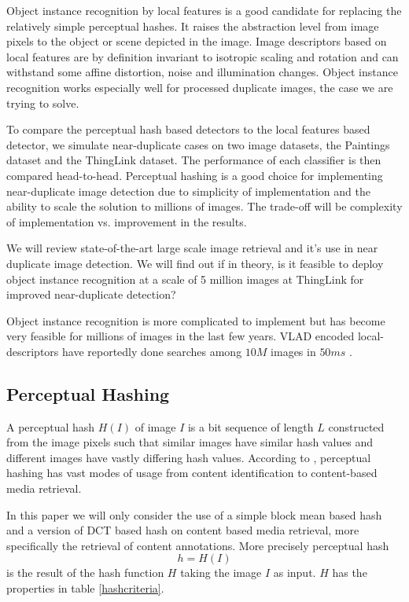 \documentclass[english,12pt,a4paper,pdftex,elec,utf8, table]{aaltothesis}
\begin{document}
Object instance recognition by local features is a good candidate for replacing the relatively simple perceptual hashes. It raises the abstraction level from image pixels to the object or scene depicted in the image. Image descriptors based on local features are by definition invariant to isotropic scaling and rotation and can withstand some affine distortion, noise and illumination changes. Object instance recognition works especially well for processed duplicate images, the case we are trying to solve.

To compare the perceptual hash based detectors to the local features based detector, we simulate near-duplicate cases on two image datasets, the Paintings dataset and the ThingLink dataset. The performance of each classifier is then compared head-to-head. Perceptual hashing is a good choice for implementing near-duplicate image detection due to simplicity of implementation and the ability to scale the solution to millions of images. The trade-off will be complexity of implementation vs. improvement in the results.

We will review state-of-the-art large scale image retrieval and it's use in near duplicate image detection. We will find out if in theory, is it feasible to deploy object instance recognition at a scale of 5 million images at ThingLink for improved near-duplicate detection?

Object instance recognition is more complicated to implement but has become very feasible for millions of images in the last few years. VLAD encoded local-descriptors have reportedly done searches among $10M$ images in $50ms$ \cite{Jegou2010}.

\clearpage

\subsection{Perceptual Hashing} \label{perceptualhash}
A perceptual hash $H(I)$ of image $I$ is a bit sequence of length $L$ constructed from the image pixels such that similar images have similar hash values and different images have vastly differing hash values. According to \cite{Zauner2010}, perceptual hashing has vast modes of usage from content identification to content-based media retrieval.

In this paper we will only consider the use of a simple block mean based hash and a version of DCT based hash on content based media retrieval, more specifically the retrieval of content annotations. More precisely perceptual hash
\begin{equation}\label{hashfunction}
h = H(I)
\end{equation}
is the result of the hash function $H$ taking the image $I$ as input. $H$ has the properties in table \ref{hashcriteria}.
\end{document}
